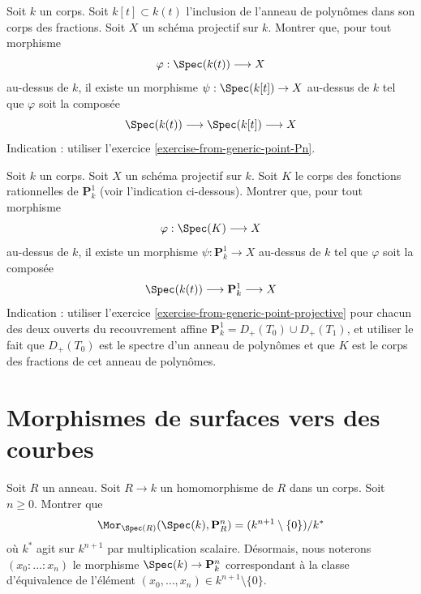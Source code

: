 \begin{exercise}
\label{exercise-from-generic-point-projective}
Soit $k$ un corps. Soit $k[t] \subset k(t)$
l'inclusion de l'anneau de polynômes dans son corps des fractions.
Soit $X$ un schéma projectif sur $k$.
Montrer que, pour tout morphisme
$$
\varphi : \Spec(k(t)) \longrightarrow X
$$
au-dessus de $k$, il existe un morphisme $\psi : \Spec(k[t]) \to X$
au-dessus de $k$ tel que $\varphi$ soit la composée
$$
\Spec(k(t)) \longrightarrow \Spec(k[t]) \longrightarrow X
$$
Indication : utiliser l'exercice \ref{exercise-from-generic-point-Pn}.
\end{exercise}

\begin{exercise}
\label{exercise-from-generic-point-P1-to-projective}
Soit $k$ un corps. Soit $X$ un schéma projectif sur $k$.
Soit $K$ le corps des fonctions rationnelles de $\mathbf{P}^1_k$ (voir
l'indication ci-dessous). Montrer que, pour tout morphisme
$$
\varphi : \Spec(K) \longrightarrow X
$$
au-dessus de $k$, il existe un morphisme $\psi : \mathbf{P}^1_k \to X$
au-dessus de $k$ tel que $\varphi$ soit la composée
$$
\Spec(k(t)) \longrightarrow \mathbf{P}^1_k \longrightarrow X
$$
Indication : utiliser l'exercice \ref{exercise-from-generic-point-projective}
pour chacun des deux ouverts du recouvrement affine
$\mathbf{P}^1_k = D_+(T_0) \cup D_+(T_1)$, et utiliser le fait que
$D_+(T_0)$ est le spectre d'un anneau de polynômes et que
$K$ est le corps des fractions de cet anneau de polynômes.
\end{exercise}







\section{Morphismes de surfaces vers des courbes}
\label{section-from-surfaces-to-curves}

\begin{exercise}
\label{exercise-points-projective-space}
Soit $R$ un anneau.
Soit $R \to k$ un homomorphisme de $R$ dans un corps.
Soit $n \geq 0$.
Montrer que
$$
\Mor_{\Spec(R)}(\Spec(k), \mathbf{P}^n_R)
=
(k^{n + 1} \setminus \{0\})/k^*
$$
où $k^*$ agit sur $k^{n + 1}$ par multiplication scalaire.
Désormais, nous noterons $(x_0 : \ldots : x_n)$ le
morphisme $\Spec(k) \to \mathbf{P}^n_k$ correspondant
à la classe d'équivalence de l'élément
$(x_0, \ldots, x_n) \in k^{n + 1} \setminus \{0\}$.
\end{exercise}

